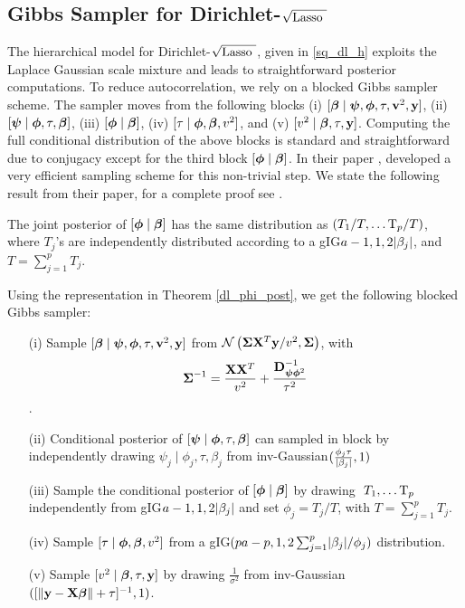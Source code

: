 \documentclass[10pt]{article}
\def\sqdl{Dirichlet-$\sqrt{\text{\rm{Lasso} }}$}
\begin{document}
\subsection{Gibbs Sampler for \sqdl{}}\label{subsec:comp-dl}

The hierarchical model for \sqdl{}, given in \eqref{sq_dl_h} exploits the Laplace Gaussian scale mixture and leads to straightforward posterior computations. To reduce autocorrelation, we rely on a blocked Gibbs sampler scheme. The sampler moves from the following blocks \rm{(i)} $ [ \boldsymbol{\beta} \mid \boldsymbol{\psi} , \boldsymbol{\phi} , \tau , {\bf v}^2 , {\bf y} ] $, \rm{(ii)} $[\boldsymbol{\psi} \mid \boldsymbol{\phi} , \tau , \boldsymbol{\beta}]$, \rm{(iii)}   $[ \boldsymbol{\phi} \mid \boldsymbol{\beta}]$, \rm{(iv)} $[ \tau \mid \boldsymbol{\phi}, \boldsymbol{\beta}, v^2 ]$, and \rm{(v)} $[ v^2 \mid \boldsymbol{\beta} ,\tau , {\bf y} ]  $. Computing the full conditional distribution of the above blocks is standard and straightforward due to conjugacy except for the third block $[ \boldsymbol{\phi} \mid \boldsymbol{\beta}]$. In their paper \citet{bhattacharya2014dirichlet}, developed a very efficient sampling scheme for this non-trivial step. We state the following result from their paper, for a complete proof see \citep{bhattacharya2014dirichlet}.


\begin{theorem}\label{dl_phi_post}
The joint posterior of $[\boldsymbol{\phi} \mid \boldsymbol{\beta} ]$ has the same distribution as $ \left( T_1/T, \ldots {\rm T}_p/T \right)$, where $T_j$'s are independently distributed according to a \rm{gIG}$a-1 , 1 , 2\lvert\beta_j\rvert$, and $T = \sum_{j=1}^{p}T_j$. 
\end{theorem}

Using the representation in Theorem \ref{dl_phi_post}, we get the following blocked Gibbs sampler:
\begin{itemize}
\item[(i)] Sample $[ \boldsymbol{\beta} \mid \boldsymbol{\psi} , \boldsymbol{\phi} , \tau , {\bf v}^2 , {\bf y} ]$ from $\mathcal{N} \left( \boldsymbol{\Sigma} {\bf X}^T{\bf y}/v^2 , \boldsymbol{\Sigma} \right)$, with $$ \boldsymbol{\Sigma}^{-1} = \frac{{\bf X}{\bf X}^T}{v^2} + \frac{{\bf D}^{-1}_{\boldsymbol{\psi} \boldsymbol{\phi}^2}}{\tau^2} $$.

\item[(ii)]Conditional posterior of $[\boldsymbol{\psi} \mid \boldsymbol{\phi} , \tau , \boldsymbol{\beta}]$ can sampled in block  by independently drawing $ \psi_j \mid \phi_j , \tau , \beta_j $ from \rm{inv-Gaussian}$ (\frac{\phi_j\tau}{\lvert\beta_j\rvert} ,1) $

\item[(iii)] Sample the conditional posterior of $[ \boldsymbol{\phi} \mid \boldsymbol{\beta}]$ by drawing $ \ T_1, \ldots {\rm T}_p$ independently from \rm{gIG}$a-1 , 1 , 2\lvert\beta_j\rvert$ and set $\phi_j = T_j/T$, with $T = \sum_{j=1}^{p}T_j$.

\item[(iv)] Sample $[ \tau \mid \boldsymbol{\phi}, \boldsymbol{\beta}, v^2 ]$ from a \rm{gIG}$( pa-p , 1 , 2\sum^{p}_{j=1}\lvert\beta_j\rvert/\phi_j )$ distribution.

\item[(v)] Sample $[ v^2 \mid \boldsymbol{\beta} ,\tau , {\bf y} ]  $ by drawing $ \frac{1}{\sigma^2} $ from \rm{inv-Gaussian}$ ( [ \lVert{\bf y} - {\bf X}\boldsymbol{\beta}\rVert + \tau ]^{-1} ,1) $.
\end{itemize}
\end{document}

